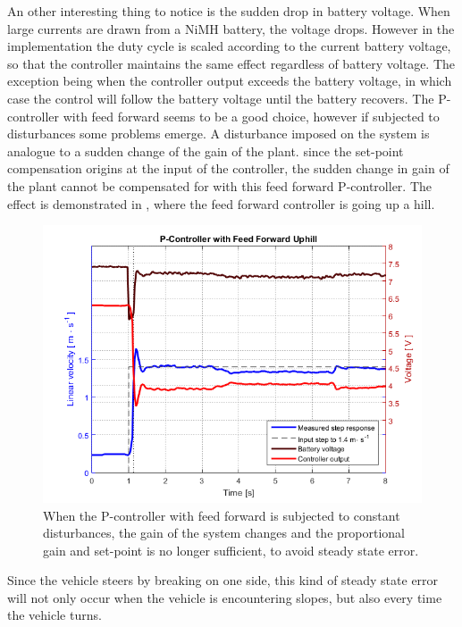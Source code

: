 An other interesting thing to notice is the sudden drop in battery voltage. When large currents are drawn from a NiMH battery, the voltage drops\cite{BatteryDS}. However in the implementation the duty cycle is scaled according to the current battery voltage, so that the controller maintains the same effect regardless of battery voltage. The exception being when the controller output exceeds the battery voltage, in which case the control will follow the battery voltage until the battery recovers.
%
The P-controller with feed forward seems to be a good choice, however if subjected to disturbances some problems emerge. A disturbance imposed on the system is analogue to a sudden change of the gain of the plant. since the set-point compensation origins at the input of the controller, the sudden change in gain of the plant cannot be compensated for with this feed forward P-controller.
%
The effect is demonstrated in , where the feed forward controller is going up a hill.
%
\begin{figure}[H]
 	\centering
 	\includegraphics[width=.9\textwidth]{figures/hillPfeedForward}
 	\caption{When the P-controller with feed forward is subjected to constant disturbances, the gain of the system changes and the proportional gain and set-point is no longer sufficient, to avoid steady state error.}
 	\label{fig:hillPfeedForward}
\end{figure}
%
Since the vehicle steers by breaking on one side, this kind of steady state error will not only occur when the vehicle is encountering slopes, but also every time the vehicle turns.
%
